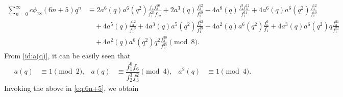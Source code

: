 \documentclass[12pt]{article}
\numberwithin{equation}{section}
\theoremstyle{plain}
\numberwithin{theorem}{section}
\theoremstyle{definition}
\theoremstyle{remark}
\begin{document}
      \begin{align}
         \sum_{n=0}^\infty c\phi_{18}(6n+5)q^n&\equiv2 a^6(q) a^6(q^2) \frac{f_4 f_3^{16}}{f_1^{23} f_{12}}+2 a^3(q) \frac{f_3^{12}}{f_1^{19}}-4 a^8(q) \frac{f_4^3 f_3^{12}}{f_1^{31}}+4 a^6(q) a^6(q^2) \frac{f_3^{12}}{f_1^{19}}\nonumber\\&\quad+4 a^5(q) \frac{f_3^{12}}{f_1^{19}}+4 a^3(q) a^5(q^2) \frac{f_3^{12}}{f_1^{19}}+4 a^2(q) a^6(q^2)\frac{f_6^3}{f_1}+4 a^3(q) a^6(q^2) q\frac{f_3^{21}}{f_1^{22}}\nonumber\\&\quad+4 a^2(q) a^6(q^2) q^2\frac{f_3^{30}}{f_1^{25}}\pmod8 .\label{eq:6n+5}
    \end{align}
        From \eqref{id:a(q)}, it can be easily seen that
    \begin{align*}
        a(q)&\equiv1 \pmod2,  &
        a(q)&\equiv\dfrac{f_1^6f_6}{f_2^3f_3^2}\pmod4, & 
        a^2(q)&\equiv1\pmod4.
    \end{align*}
    Invoking the above in \eqref{eq:6n+5}, we obtain
\end{document}
